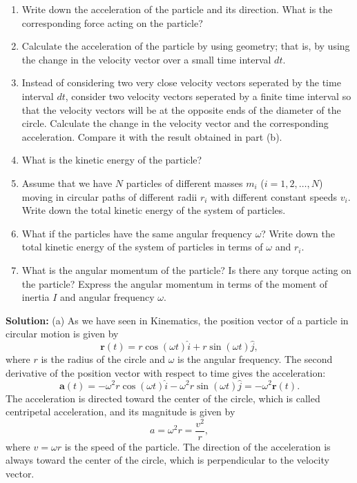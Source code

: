 \documentclass[../main.tex]{subfiles}
\begin{document}
\begin{enumerate}
    \item[(a)] Write down the acceleration of the particle and its direction. What is the corresponding force acting on the particle?
    \item[(b)] Calculate the acceleration of the particle by using geometry; that is, by using the change in the velocity vector over a small time interval $dt$. 
    \item[(c)] Instead of considering two very close velocity vectors seperated by the time interval $dt$, consider two velocity vectors seperated by a finite time interval so that the velocity vectors will be at the opposite ends of the diameter of the circle. Calculate the change in the velocity vector and the corresponding acceleration. Compare it with the result obtained in part (b).
    \item[(c)] What is the kinetic energy of the particle? 
    \item[(d)] Assume that we have $N$ particles of different masses $m_i$ ($i = 1, 2, \ldots, N$) moving in circular paths of different radii $r_i$ with different constant speeds $v_i$. Write down the total kinetic energy of the system of particles.
    \item[(e)] What if the particles have the same angular frequency $\omega$? Write down the total kinetic energy of the system of particles in terms of $\omega$ and $r_i$.
    \item[(f)] What is the angular momentum of the particle? Is there any torque acting on the particle?  Express the angular momentum in terms of the moment of inertia $I$ and angular frequency $\omega$.

\end{enumerate}

\textbf{Solution:} 
(a) As we have seen in Kinematics, the position vector of a particle in circular motion is given by
\begin{equation}
    \mathbf{r}(t) = r \cos(\omega t) \hat{i} + r \sin(\omega t) \hat{j},
\end{equation}
where $r$ is the radius of the circle and $\omega$ is the angular frequency. The second derivative of the position vector with respect to time gives the acceleration:
\begin{equation}
    \mathbf{a}(t) = -\omega^2 r \cos(\omega t) \hat{i} - \omega^2 r \sin(\omega t) \hat{j} = -\omega^2 \mathbf{r}(t).
\end{equation}
The acceleration is directed toward the center of the circle, which is called centripetal acceleration, and its magnitude is given by
\begin{equation}
    a = \omega^2 r = \frac{v^2}{r},
\end{equation}
where $v = \omega r$ is the speed of the particle. The direction of the acceleration is always toward the center of the circle, which is perpendicular to the velocity vector.
\end{document}
